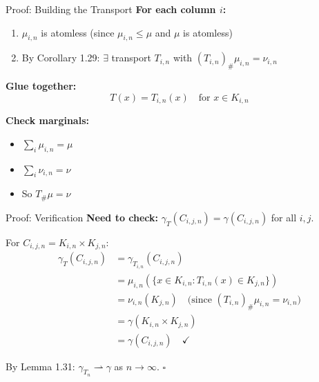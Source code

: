 \documentclass[aspectratio=169]{beamer}
\begin{document}
\begin{frame}{Proof: Building the Transport}
\textbf{For each column $i$:}
\begin{enumerate}
    \item $\mu_{i,n}$ is atomless (since $\mu_{i,n} \leq \mu$ and $\mu$ is atomless)
    \item By Corollary 1.29: $\exists$ transport $T_{i,n}$ with $(T_{i,n})_\# \mu_{i,n} = \nu_{i,n}$
\end{enumerate}

\vspace{0.3cm}
\textbf{Glue together:}
\[
T(x) = T_{i,n}(x) \quad \text{for } x \in K_{i,n}
\]

\vspace{0.2cm}
\textbf{Check marginals:}
\begin{itemize}
    \item $\sum_i \mu_{i,n} = \mu$ \checkmark
    \item $\sum_i \nu_{i,n} = \nu$ \checkmark
    \item So $T_\# \mu = \nu$ \checkmark
\end{itemize}

\begin{center}
\end{center}
\end{frame}

\begin{frame}{Proof: Verification}
\textbf{Need to check:} $\gamma_T(C_{i,j,n}) = \gamma(C_{i,j,n})$ for all $i, j$.

\vspace{0.3cm}
For $C_{i,j,n} = K_{i,n} \times K_{j,n}$:
\begin{align*}
\gamma_T(C_{i,j,n}) &= \gamma_{T_{i,n}}(C_{i,j,n}) \\
&= \mu_{i,n}(\{x \in K_{i,n} : T_{i,n}(x) \in K_{j,n}\}) \\
&= \nu_{i,n}(K_{j,n}) \quad \text{(since } (T_{i,n})_\# \mu_{i,n} = \nu_{i,n}\text{)} \\
&= \gamma(K_{i,n} \times K_{j,n}) \\
&= \gamma(C_{i,j,n}) \quad \checkmark
\end{align*}

\vspace{0.3cm}
By Lemma 1.31: $\gamma_{T_n} \rightharpoonup \gamma$ as $n \to \infty$. \hfill $\square$
\end{frame}
\end{document}
